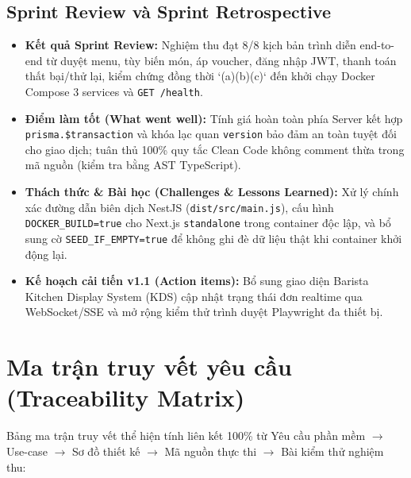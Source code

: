 \documentclass[a4paper,12pt]{article}
\begin{document}
\subsection{Sprint Review và Sprint Retrospective}
\begin{itemize}
  \item \textbf{Kết quả Sprint Review:} Nghiệm thu đạt 8/8 kịch bản trình diễn end-to-end từ duyệt menu, tùy biến món, áp voucher, đăng nhập JWT, thanh toán thất bại/thử lại, kiểm chứng đồng thời `(a)(b)(c)` đến khởi chạy Docker Compose 3 services và \texttt{GET /health}.
  \item \textbf{Điểm làm tốt (What went well):} Tính giá hoàn toàn phía Server kết hợp \texttt{prisma.\$transaction} và khóa lạc quan \texttt{version} bảo đảm an toàn tuyệt đối cho giao dịch; tuân thủ 100\% quy tắc Clean Code không comment thừa trong mã nguồn (kiểm tra bằng AST TypeScript).
  \item \textbf{Thách thức \& Bài học (Challenges \& Lessons Learned):} Xử lý chính xác đường dẫn biên dịch NestJS (\texttt{dist/src/main.js}), cấu hình \texttt{DOCKER\_BUILD=true} cho Next.js \texttt{standalone} trong container độc lập, và bổ sung cờ \texttt{SEED\_IF\_EMPTY=true} để không ghi đè dữ liệu thật khi container khởi động lại.
  \item \textbf{Kế hoạch cải tiến v1.1 (Action items):} Bổ sung giao diện Barista Kitchen Display System (KDS) cập nhật trạng thái đơn realtime qua WebSocket/SSE và mở rộng kiểm thử trình duyệt Playwright đa thiết bị.
\end{itemize}

\newpage
\section{Ma trận truy vết yêu cầu (Traceability Matrix)}

Bảng ma trận truy vết thể hiện tính liên kết 100\% từ Yêu cầu phần mềm $\rightarrow$ Use-case $\rightarrow$ Sơ đồ thiết kế $\rightarrow$ Mã nguồn thực thi $\rightarrow$ Bài kiểm thử nghiệm thu:
\end{document}
